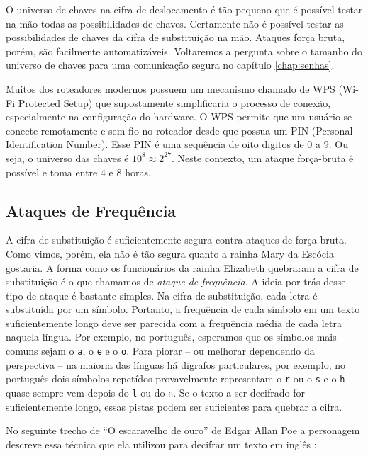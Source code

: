 O universo de chaves na cifra de deslocamento é tão pequeno que é possível testar na mão todas as possibilidades de chaves.
Certamente não é possível testar as possibilidades de chaves da cifra de substituição na mão.
Ataques força bruta, porém, são facilmente automatizáveis.
Voltaremos a pergunta sobre o tamanho do universo de chaves para uma comunicação segura no capítulo \ref{chap:senhas}.


\begin{example}
Muitos dos roteadores modernos possuem um mecanismo chamado de WPS (Wi-Fi Protected Setup) que supostamente simplificaria o processo de conexão, especialmente na configuração do hardware.
O WPS permite que um usuário se conecte remotamente e sem fio no roteador desde que possua um PIN (Personal Identification Number).
Esse PIN é uma sequência de oito digitos de 0 a 9.
Ou seja, o universo das chaves é $10^8 \approx 2^{27}$.
Neste contexto, um ataque força-bruta é possível e toma entre 4 e 8 horas.
\end{example}


\subsection{Ataques de Frequência}
\label{sec:frequencia}

A cifra de substituição é suficientemente segura contra ataques de força-bruta.
Como vimos, porém, ela não é tão segura quanto a rainha Mary da Escócia gostaria.
A forma como os funcionários da rainha Elizabeth quebraram a cifra de substituição é o que chamamos de {\em ataque de frequência}.
A ideia por trás desse tipo de ataque é bastante simples.
Na cifra de substituição, cada letra é substituída por um símbolo.
Portanto, a frequência de cada símbolo em um texto suficientemente longo deve ser parecida com a frequência média de cada letra naquela língua.
Por exemplo, no português, esperamos que os símbolos mais comuns sejam o {\tt a}, o {\tt e} e o {\tt o}.
Para piorar -- ou melhorar dependendo da perspectiva -- na maioria das línguas há digrafos particulares, por exemplo, no português dois símbolos repetídos provavelmente representam o {\tt r} ou o {\tt s} e o {\tt h} quase sempre vem depois do {\tt l} ou do {\tt n}.
Se o texto a ser decifrado for suficientemente longo, essas pistas podem ser suficientes para quebrar a cifra.

No seguinte trecho de ``O escaravelho de ouro'' de Edgar Allan Poe a personagem descreve essa técnica que ela utilizou para decifrar um texto em inglês \cite{}:

